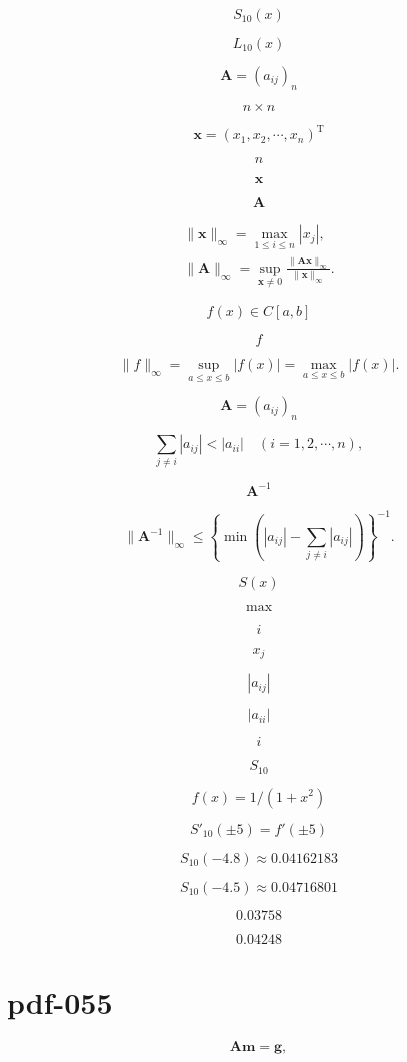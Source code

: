 \documentclass[fontset=fandol]{ctexart}
\begin{document}
\[S_{10}(x)\]

\[L_{10}(x)\]

\[\boldsymbol A=(a_{ij})_n\]

\[n\times n\]

\[\boldsymbol x=(x_1,x_2,\cdots,x_n)^{\mathrm T}\]

\[n\]

\[\boldsymbol x\]

\[\boldsymbol A\]

\[\begin{gathered}
\|\boldsymbol x\|_\infty=\max_{1\leqslant i\leqslant n}|x_j|,\\
\|\boldsymbol A\|_\infty=\sup_{\boldsymbol x\ne0}\frac{\|\boldsymbol A\boldsymbol x\|_\infty}{\|\boldsymbol x\|_\infty}.
\end{gathered}\tag{2.8.21}\]

\[f(x)\in C[a,b]\]

\[f\]

\[\|f\|_\infty=\sup_{a\leqslant x\leqslant b}|f(x)|=\max_{a\leqslant x\leqslant b}|f(x)|.\]

\[\boldsymbol A=(a_{ij})_n\]

\[\sum_{j\ne i}|a_{ij}|<|a_{ii}|\quad(i=1,2,\cdots,n),\tag{2.8.22}\]

\[\boldsymbol A^{-1}\]

\[\|\boldsymbol A^{-1}\|_\infty\leqslant\left\{\min\left(|a_{ij}|-\sum_{j\ne i}|a_{ij}|\right)\right\}^{-1}.\tag{2.8.23}\]

\[S(x)\]

\[\max\]

\[i\]

\[x_j\]

\[|a_{ij}|\]

\[|a_{ii}|\]

\[i\]

\[S_{10}\]

\[f(x)=1/(1+x^2)\]

\[S'_{10}(\pm5)=f'(\pm5)\]

\[S_{10}(-4.8)\approx0.04162183\]

\[S_{10}(-4.5)\approx0.04716801\]

\[0.03758\]

\[0.04248\]

\section*{pdf-055}

\[\boldsymbol A\boldsymbol m=\boldsymbol g,\tag{2.8.24}\]
\end{document}
